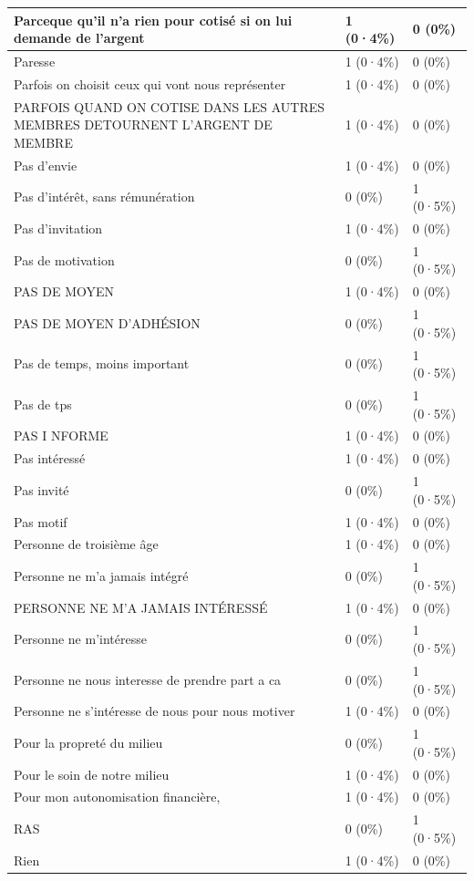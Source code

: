 \documentclass[
]{book}
\begin{document}
\begin{tabular}{l|l|l}
\hline
Parceque qu'il n'a rien pour cotisé si on lui demande de l'argent & 1 (0·4\%) & 0 (0\%)\\
\hline
Paresse & 1 (0·4\%) & 0 (0\%)\\
\hline
Parfois on choisit ceux qui vont nous représenter & 1 (0·4\%) & 0 (0\%)\\
\hline
PARFOIS QUAND ON COTISE DANS  LES AUTRES MEMBRES DETOURNENT L'ARGENT DE MEMBRE & 1 (0·4\%) & 0 (0\%)\\
\hline
Pas d'envie & 1 (0·4\%) & 0 (0\%)\\
\hline
Pas d'intérêt, sans rémunération & 0 (0\%) & 1 (0·5\%)\\
\hline
Pas d'invitation & 1 (0·4\%) & 0 (0\%)\\
\hline
Pas de motivation & 0 (0\%) & 1 (0·5\%)\\
\hline
PAS DE MOYEN & 1 (0·4\%) & 0 (0\%)\\
\hline
PAS DE MOYEN D'ADHÉSION & 0 (0\%) & 1 (0·5\%)\\
\hline
Pas de temps, moins important & 0 (0\%) & 1 (0·5\%)\\
\hline
Pas de tps & 0 (0\%) & 1 (0·5\%)\\
\hline
PAS I NFORME & 1 (0·4\%) & 0 (0\%)\\
\hline
Pas intéressé & 1 (0·4\%) & 0 (0\%)\\
\hline
Pas invité & 0 (0\%) & 1 (0·5\%)\\
\hline
Pas motif & 1 (0·4\%) & 0 (0\%)\\
\hline
Personne de troisième âge & 1 (0·4\%) & 0 (0\%)\\
\hline
Personne ne m'a jamais intégré & 0 (0\%) & 1 (0·5\%)\\
\hline
PERSONNE NE M'A JAMAIS INTÉRESSÉ & 1 (0·4\%) & 0 (0\%)\\
\hline
Personne ne m'intéresse & 0 (0\%) & 1 (0·5\%)\\
\hline
Personne ne nous interesse de prendre part a ca & 0 (0\%) & 1 (0·5\%)\\
\hline
Personne ne s'intéresse de nous pour nous motiver & 1 (0·4\%) & 0 (0\%)\\
\hline
Pour la propreté du milieu & 0 (0\%) & 1 (0·5\%)\\
\hline
Pour le soin de notre milieu & 1 (0·4\%) & 0 (0\%)\\
\hline
Pour mon autonomisation financière, & 1 (0·4\%) & 0 (0\%)\\
\hline
RAS & 0 (0\%) & 1 (0·5\%)\\
\hline
Rien & 1 (0·4\%) & 0 (0\%)\\

\end{tabular}
\end{document}
